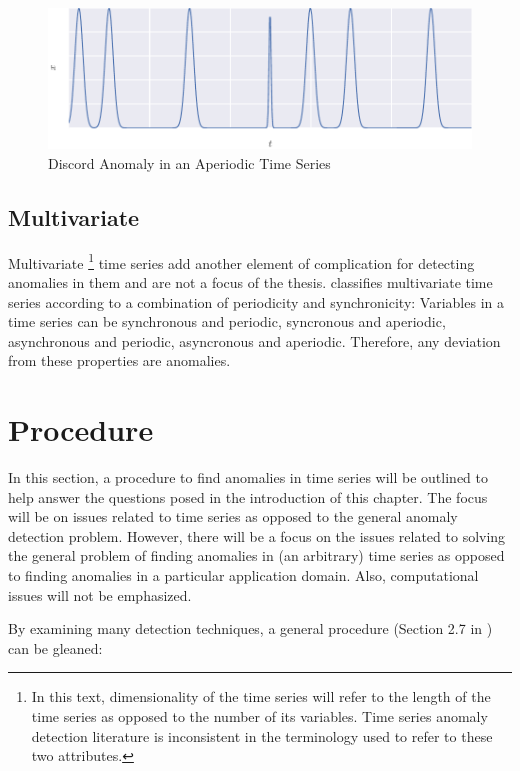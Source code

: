 \begin{figure}[H]
  \centering
  \includegraphics{figs/discord_aper.pdf}
  \caption{Discord Anomaly in an Aperiodic Time Series}
  \label{fig:aperdiscordanom}
\end{figure}

\subsection{Multivariate}

Multivariate \footnote{In this text, dimensionality of the time series will refer to the length of the time series as opposed to the number of its variables. Time series anomaly detection literature is inconsistent in the terminology used to refer to these two attributes.} time series add another element of complication for detecting anomalies in them and are not a focus of the thesis. \cite{Cheboli2010} classifies multivariate time series according to a combination of periodicity and synchronicity: Variables in a time series can be synchronous and periodic, syncronous and aperiodic, asynchronous and periodic, asyncronous and aperiodic. Therefore, any deviation from these properties are anomalies.




\section{Procedure}


In this section, a procedure to find anomalies in time series will be outlined to help answer the questions posed in the introduction of this chapter. The focus will be on issues related to time series as opposed to the general anomaly detection problem. However, there will be a focus on the issues related to solving the general problem of finding anomalies in (an arbitrary) time series as opposed to finding anomalies in a particular application domain. Also, computational issues will not be emphasized.

By examining many detection techniques, a general procedure (Section 2.7 in \cite{Cheboli2010}) can be gleaned:

